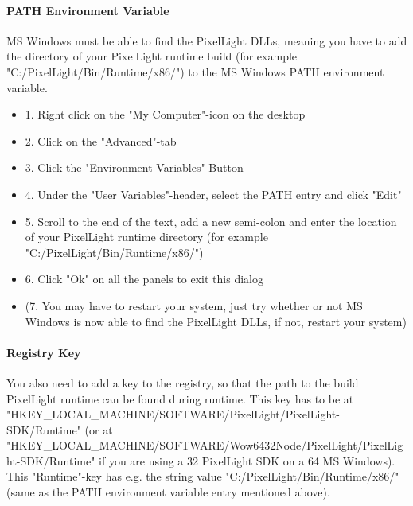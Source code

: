 \paragraph{PATH Environment Variable}
MS Windows must be able to find the PixelLight \ac{DLL}s, meaning you have to add the directory of your PixelLight runtime build (for example "C:/PixelLight/Bin/Runtime/x86/") to the MS Windows PATH environment variable.
\begin{itemize}
\item{1. Right click on the "My Computer"-icon on the desktop}
\item{2. Click on the "Advanced"-tab}
\item{3. Click the "Environment Variables"-Button}
\item{4. Under the "User Variables"-header, select the PATH entry and click "Edit"}
\item{5. Scroll to the end of the text, add a new semi-colon and enter the location of your PixelLight runtime directory (for example "C:/PixelLight/Bin/Runtime/x86/")}
\item{6. Click "Ok" on all the panels to exit this dialog}
\item{(7. You may have to restart your system, just try whether or not MS Windows is now able to find the PixelLight \ac{DLL}s, if not, restart your system)}
\end{itemize}


\paragraph{Registry Key}
You also need to add a key to the registry, so that the path to the build PixelLight runtime can be found during runtime. This key has to be at "HKEY\_LOCAL\_MACHINE/SOFTWARE/PixelLight/PixelLight-SDK/Runtime" (or at "HKEY\_LOCAL\_MACHINE/SOFTWARE/Wow6432Node/PixelLight/PixelLight-SDK/Runtime" if you are using a \SI{32}{\bit} PixelLight SDK on a \SI{64}{\bit} MS Windows). This "Runtime"-key has e.g. the string value "C:/PixelLight/Bin/Runtime/x86/" (same as the PATH environment variable entry mentioned above).

